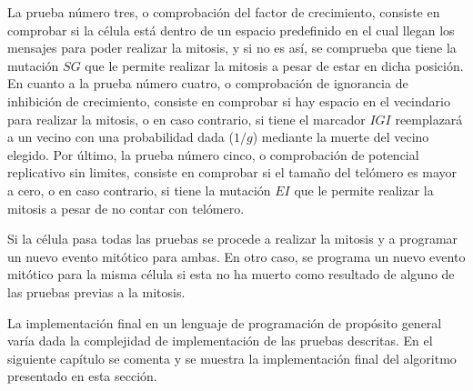 La prueba número tres, o comprobación del factor de crecimiento, consiste en comprobar
si la célula está dentro de un espacio predefinido en el cual llegan los mensajes
para poder realizar la mitosis, y si no es así, se comprueba que tiene la mutación $SG$
que le permite realizar la mitosis a pesar de estar en dicha posición. En cuanto a la prueba
número cuatro, o comprobación de ignorancia de inhibición de crecimiento, consiste en comprobar
si hay espacio en el vecindario para realizar la mitosis, o en caso contrario, si tiene el marcador
$IGI$ reemplazará a un vecino con una probabilidad dada ($1/g$) mediante la muerte del vecino elegido.
Por último, la prueba número cinco, o comprobación de potencial replicativo sin limites,
consiste en comprobar si el tamaño del telómero es mayor a cero, o en caso contrario,
si tiene la mutación $EI$ que le permite realizar la mitosis a pesar de no contar con telómero.

Si la célula pasa todas las pruebas se procede a realizar la mitosis y a programar un nuevo evento mitótico para ambas.
En otro caso, se programa un nuevo evento mitótico para la misma célula si esta no ha muerto como
resultado de alguno de las pruebas previas a la mitosis.

La implementación final en un lenguaje de programación de propósito general varía dada
la complejidad de implementación de las pruebas descritas. En el siguiente capítulo se comenta y se muestra
la implementación final del algoritmo presentado en esta sección.
